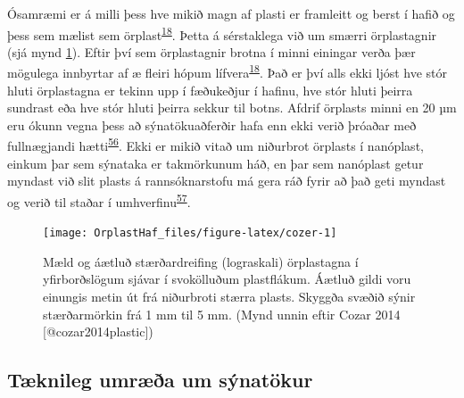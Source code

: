 \documentclass[icelandic,]{book}
\begin{document}
Ósamræmi er á milli þess hve mikið magn af plasti er framleitt og berst í hafið og þess sem mælist sem örplast\textsuperscript{\protect\hyperlink{ref-cozar2014plastic}{18}}. Þetta á sérstaklega við um smærri örplastagnir (sjá mynd \ref{fig:cozer}). Eftir því sem örplastagnir brotna í minni einingar verða þær mögulega innbyrtar af æ fleiri hópum lífvera\textsuperscript{\protect\hyperlink{ref-cozar2014plastic}{18}}. Það er því alls ekki ljóst hve stór hluti örplastagna er tekinn upp í fæðukeðjur í hafinu, hve stór hluti þeirra sundrast eða hve stór hluti þeirra sekkur til botns. Afdrif örplasts minni en 20 µm eru ókunn vegna þess að sýnatökuaðferðir hafa enn ekki verið þróaðar með fullnægjandi hætti\textsuperscript{\protect\hyperlink{ref-RENNER201855}{56}}. Ekki er mikið vitað um niðurbrot örplasts í nanóplast, einkum þar sem sýnataka er takmörkunum háð, en þar sem nanóplast getur myndast við slit plasts á rannsóknarstofu má gera ráð fyrir að það geti myndast og verið til staðar í umhverfinu\textsuperscript{\protect\hyperlink{ref-lambert2016formation}{57}}.

\begin{figure}

{\centering \texttt{[image: OrplastHaf\_files/figure-latex/cozer-1]} 

}

\caption{Mæld og áætluð stærðardreifing (lograskali) örplastagna í yfirborðslögum sjávar í svokölluðum plastflákum. Áætluð gildi voru einungis metin út frá niðurbroti stærra plasts. Skyggða svæðið sýnir stærðarmörkin frá 1 mm til 5 mm. (Mynd unnin eftir Cozar 2014 [@cozar2014plastic])}\label{fig:cozer}
\end{figure}

\hypertarget{tknileg-umra-um-synatokur}{%
\subsection*{Tæknileg umræða um sýnatökur}\label{tknileg-umra-um-synatokur}}
\end{document}
